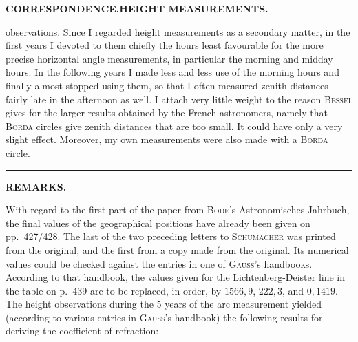 \par\clearpage
\noindent{}\hfill{\small\textbf{CORRESPONDENCE.\quad HEIGHT MEASUREMENTS.}}\hfill\null\par\medskip
\noindent observations. Since I regarded height measurements as a secondary matter, in the
first years I devoted to them chiefly the hours least favourable for the more precise
horizontal angle measurements, in particular the morning and midday hours. In the
following years I made less and less use of the morning hours and finally almost
stopped using them, so that I often measured zenith distances fairly late in the
afternoon as well. I attach very little weight to the reason \textsc{Bessel} gives for the
larger results obtained by the French astronomers, namely that \textsc{Borda} circles
give zenith distances that are too small. It could have only a very slight effect.
Moreover, my own measurements were also made with a \textsc{Borda} circle.
\begin{center}\rule{.16\linewidth}{.4pt}\end{center}
\begin{center}\textbf{REMARKS.}\end{center}
\begingroup\small
\par\noindent\hspace*{\parindent}With regard to the first part of the paper from \textsc{Bode}'s Astronomisches Jahrbuch,
the final values of the geographical positions have already been given on pp.~427/428.
The last of the two preceding letters to \textsc{Schumacher} was printed from the original,
and the first from a copy made from the original. Its numerical values could be
checked against the entries in one of \textsc{Gauss}'s handbooks. According to that
handbook, the values given for the Lichtenberg-Deister line in the table on p.~439
are to be replaced, in order, by \(1566{,}9\), \(222{,}3\), and \(0{,}1419\).
The height observations during the 5 years of the arc measurement yielded (according to
various entries in \textsc{Gauss}'s handbook) the following results for deriving the
coefficient of refraction:
